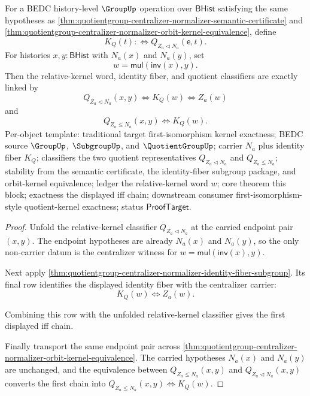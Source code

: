 \begin{theorem}
\label{thm:quotientgroup-centralizer-normalizer-relative-kernel-fiber-exactness}
For a BEDC history-level $\GroupUp$ operation over $\mathsf{BHist}$ satisfying
the same hypotheses as
\autoref{thm:quotientgroup-centralizer-normalizer-semantic-certificate} and
\autoref{thm:quotientgroup-centralizer-normalizer-orbit-kernel-equivalence},
define
$$
K_Q(t) :\Longleftrightarrow Q_{Z_a\triangleleft N_a}(\mathsf{e},t).
$$
For histories $x,y:\mathsf{BHist}$ with $N_a(x)$ and $N_a(y)$, set
$$
w=\mathsf{mul}(\mathsf{inv}(x),y).
$$
Then the relative-kernel word, identity fiber, and quotient classifiers are
exactly linked by
$$
Q_{Z_a\triangleleft N_a}(x,y)
\Longleftrightarrow K_Q(w)
\Longleftrightarrow Z_a(w)
$$
and
$$
Q_{Z_a\leq N_a}(x,y)\Longleftrightarrow K_Q(w).
$$
Per-object template: traditional target first-isomorphism kernel exactness;
BEDC source $\GroupUp$, $\SubgroupUp$, and $\QuotientGroupUp$; carrier $N_a$
plus identity fiber $K_Q$; classifiers the two quotient representatives
$Q_{Z_a\triangleleft N_a}$ and $Q_{Z_a\leq N_a}$; stability from the semantic
certificate, the identity-fiber subgroup package, and orbit-kernel equivalence;
ledger the relative-kernel word $w$; core theorem this block; exactness the
displayed iff chain; downstream consumer first-isomorphism-style
quotient-kernel exactness; status $\mathsf{ProofTarget}$.
\end{theorem}
\begin{proof}
Unfold the relative-kernel classifier
$Q_{Z_a\triangleleft N_a}$ at the carried endpoint pair $(x,y)$. The endpoint
hypotheses are already $N_a(x)$ and $N_a(y)$, so the only non-carrier datum is
the centralizer witness for
$w=\mathsf{mul}(\mathsf{inv}(x),y)$.

Next apply
\autoref{thm:quotientgroup-centralizer-normalizer-identity-fiber-subgroup}.
Its final row identifies the displayed identity fiber with the centralizer
carrier:
$$
K_Q(w)\Longleftrightarrow Z_a(w).
$$

Combining this row with the unfolded relative-kernel classifier gives the first
displayed iff chain.

Finally transport the same endpoint pair across
\autoref{thm:quotientgroup-centralizer-normalizer-orbit-kernel-equivalence}.
The carried hypotheses $N_a(x)$ and $N_a(y)$ are unchanged, and the equivalence
between $Q_{Z_a\leq N_a}(x,y)$ and $Q_{Z_a\triangleleft N_a}(x,y)$ converts the
first chain into
$Q_{Z_a\leq N_a}(x,y)\Longleftrightarrow K_Q(w)$.
\end{proof}

